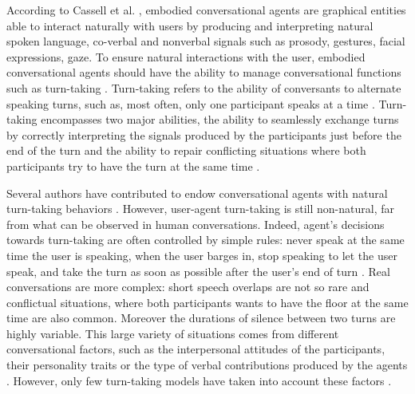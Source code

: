 According to Cassell et al. \cite{cassell_embodiment_1999}, embodied conversational agents are graphical entities able to interact naturally with users by producing and interpreting natural spoken language, co-verbal and nonverbal signals such as prosody, gestures, facial expressions, gaze. 
To ensure natural interactions with the user, embodied conversational agents should have the ability to manage conversational functions such as turn-taking \citep{cassell_embodiment_1999}. Turn-taking refers to the ability of conversants to alternate speaking turns, such as, most often, only one participant speaks at a time \citep{sacks_simplest_1974}. Turn-taking encompasses two major abilities, the ability to seamlessly exchange turns by correctly interpreting the signals produced by the participants just before the end of the turn
and the ability to repair conflicting situations where both participants try to have the turn at the same time \citep{thorisson_natural_2002}. 

Several authors have contributed to endow conversational agents with natural turn-taking behaviors \citep{thorisson_natural_2002,raux_optimizing_2012,jonsdottir_distributed_2013}. However, user-agent turn-taking is still non-natural, far from what can be observed in human conversations. Indeed, agent's decisions towards turn-taking are often controlled by simple rules: never speak at the same time the user is speaking, when the user barges in, stop speaking to let the user speak, and take the turn as soon as possible after the user's end of turn \citep{ter_maat_how_2010}. Real conversations are more complex: short speech overlaps are not so rare and conflictual situations, where both participants wants to have the floor at the same time are also common. Moreover the durations of silence between two turns are highly variable. This large variety of situations comes from different conversational factors, such as the interpersonal attitudes of the participants, their personality traits \citep{ter_maat_how_2010} or the type of verbal contributions produced by the agents \citep{cafaro_effects_2016}. However, only few turn-taking models have taken into account these factors \citep{lessmann_towards_2004,ravenet_conversational_2015}.

